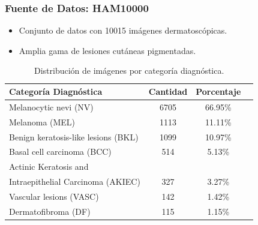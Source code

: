 \documentclass{beamer}
\begin{document}
\begin{frame}
  \frametitle{Fuente de Datos: HAM10000}
  \begin{itemize}
    \item Conjunto de datos con 10015 imágenes dermatoscópicas.
    \item Amplia gama de lesiones cutáneas pigmentadas.
  \end{itemize}

  \begin{table}[H]
    \centering
    \small
    \begin{tabular}{lccc}
    \hline
    \textbf{Categoría Diagnóstica} & \textbf{Cantidad} & \textbf{Porcentaje} \\
    \hline
    Melanocytic nevi (NV) & 6705 & 66.95\%  \\
    Melanoma (MEL) & 1113 & 11.11\% \\
    Benign keratosis-like lesions (BKL) & 1099 & 10.97\% \\
    Basal cell carcinoma (BCC) & 514 & 5.13\% \\
    Actinic Keratosis and \\ Intraepithelial Carcinoma (AKIEC) & 327  & 3.27\% \\
    Vascular lesions (VASC) & 142 & 1.42\%  \\
    Dermatofibroma  (DF) & 115 & 1.15\% \\
    \hline
    \end{tabular}
    \caption{Distribución de imágenes por categoría diagnóstica.}
    \label{tab:ham10000_distribution}
 \end{table} 

\end{frame}
\end{document}
